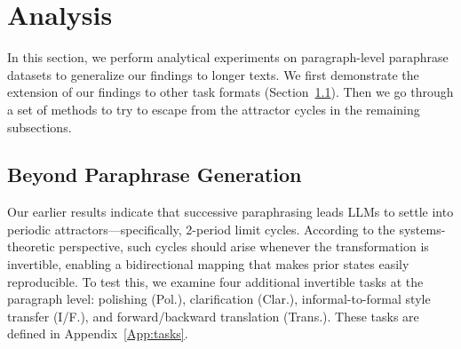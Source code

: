 \section{Analysis}
\label{sec:Analysis}
In this section, we perform analytical experiments on paragraph-level paraphrase datasets to generalize our findings to longer texts.
We first demonstrate the extension of our findings to other task formats (Section~\ref{sec:beyond paraphrasing}). 
Then we go through a set of methods to try to escape from the attractor cycles in the remaining subsections.

\subsection{Beyond Paraphrase Generation}
\label{sec:beyond paraphrasing}



Our earlier results indicate that successive paraphrasing leads LLMs to settle into periodic attractors—specifically, 2-period limit cycles. According to the systems-theoretic perspective, such cycles should arise whenever the transformation is invertible, enabling a bidirectional mapping that makes prior states easily reproducible. To test this, we examine four additional invertible tasks at the paragraph level: polishing (Pol.), clarification (Clar.), informal-to-formal style transfer (I/F.), and forward/backward translation (Trans.). These tasks are defined in Appendix~\ref{App:tasks}.

